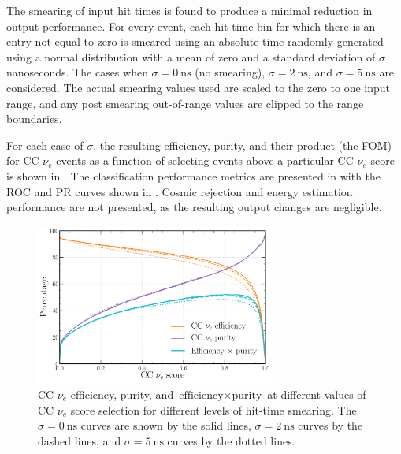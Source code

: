 The smearing of input hit times is found to produce a minimal reduction in output performance. For
every event, each hit-time bin for which there is an entry not equal to zero is smeared using an
absolute time randomly generated using a normal distribution with a mean of zero and a standard
deviation of $\sigma$ nanoseconds. The cases when $\sigma=0~\text{ns}$ (no smearing),
$\sigma=2~\text{ns}$, and $\sigma=5~\text{ns}$ are considered. The actual smearing values used are
scaled to the zero to one input range, and any post smearing out-of-range values are clipped to
the range boundaries.

For each case of $\sigma$, the resulting efficiency, purity, and their product (the FOM) for CC
$\nu_{e}$ events as a function of selecting events above a particular CC $\nu_{e}$ score is shown
in . The classification performance metrics are
presented in  with the ROC and PR curves shown in
. Cosmic rejection and energy estimation performance
are not presented, as the resulting output changes are negligible.

\begin{figure} %
    \includegraphics[width=0.7\textwidth]{diagrams/7-results/calib_time_nuel_eff_curves.pdf}
    \caption[CC $\nu_{e}$ efficiency and purity curves for different levels of hit-time smearing]
    {CC $\nu_{e}$ efficiency, purity, and $\text{efficiency}\times\text{purity}$ at different
        values of CC $\nu_{e}$ score selection for different levels of hit-time smearing. The
        $\sigma=0~\text{ns}$ curves are shown by the solid lines, $\sigma=2~\text{ns}$ curves by
        the dashed lines, and $\sigma=5~\text{ns}$ curves by the dotted lines.}
    \label{fig:calib_time_nuel_eff_curves}
\end{figure}

